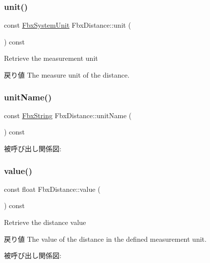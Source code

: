 \subsubsection{\texorpdfstring{unit()}{unit()}}
{\footnotesize\ttfamily const \hyperlink{class_fbx_system_unit}{Fbx\+System\+Unit} Fbx\+Distance\+::unit (\begin{DoxyParamCaption}{ }\end{DoxyParamCaption}) const}

Retrieve the measurement unit \begin{DoxyReturn}{戻り値}
The measure unit of the distance. 
\end{DoxyReturn}
\mbox{\label{class_fbx_distance_ada4c11c436abc26a08deb903a0c3de1d}} 
\subsubsection{\texorpdfstring{unit\+Name()}{unitName()}}
{\footnotesize\ttfamily const \hyperlink{class_fbx_string}{Fbx\+String} Fbx\+Distance\+::unit\+Name (\begin{DoxyParamCaption}{ }\end{DoxyParamCaption}) const}

被呼び出し関係図\+:
\mbox{\label{class_fbx_distance_a00bb7d52cd3f2494429bf7126764d2c4}} 
\subsubsection{\texorpdfstring{value()}{value()}}
{\footnotesize\ttfamily const float Fbx\+Distance\+::value (\begin{DoxyParamCaption}{ }\end{DoxyParamCaption}) const}

Retrieve the distance value \begin{DoxyReturn}{戻り値}
The value of the distance in the defined measurement unit. 
\end{DoxyReturn}
被呼び出し関係図\+:
\mbox{\label{class_fbx_distance_aab3c152aa5f66f2dad580d4a0686ce7f}} 
